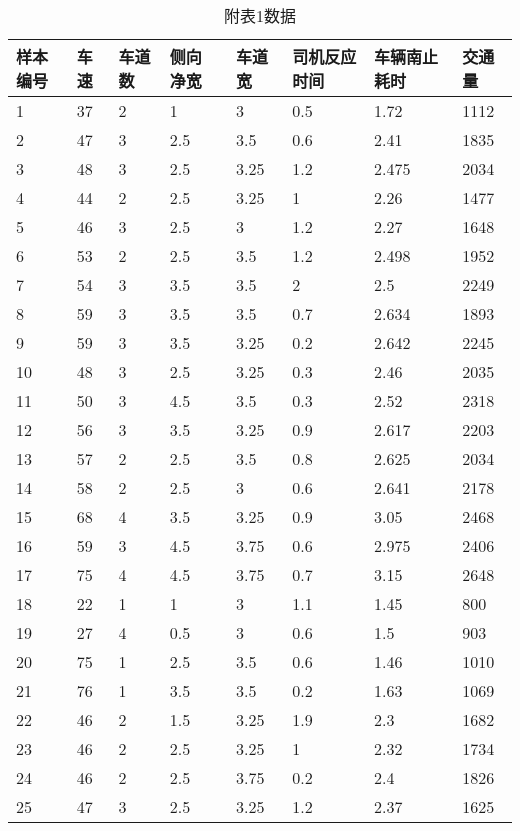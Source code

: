 
\begin{table*}[h!]
  \centering
  \small
    \caption{附表1数据}
\begin{tabular*}{\linewidth}{p{40pt}<{\centering}p{30pt}<{\centering}
p{30pt}<{\centering}p{40pt}<{\centering}p{50pt}<{\centering}p{70pt}<{\centering}
p{60pt}<{\centering}p{50pt}<{\centering}}
\toprule
样本编号 &  车速 & 车道数  & 侧向 净宽 &  车道宽  &  司机反应时间  & 车辆南止耗时  &  交通量  \\
\midrule
1 & 37 {\color{Blue} } & 2 & 1 & 3 & 0.5 & 1.72 & 1112 \\
2 & 47 & 3 & 2.5 & 3.5 & 0.6 & 2.41 & 1835 \\
3 & 48 & 3 & 2.5 & 3.25 & 1.2 & 2.475 & 2034 \\
4 & 44 & 2 & 2.5 & 3.25 & 1 & 2.26 & 1477 \\
5 & 46 & 3 & 2.5 & 3 & 1.2 & 2.27 & 1648 \\
6 & 53 & 2 & 2.5 & 3.5 & 1.2 & 2.498 & 1952 \\
7 & 54 & 3 & 3.5 & 3.5 & 2 & 2.5 & 2249 \\
8 & 59 & 3 & 3.5 & 3.5 & 0.7 & 2.634 & 1893 \\
9 & 59 & 3 & 3.5 & 3.25 & 0.2 & 2.642 & 2245 \\
10 & 48 & 3 & 2.5 & 3.25 & 0.3 & 2.46 & 2035 \\
11 & 50 & 3 & 4.5 & 3.5 & 0.3 & 2.52 & 2318 \\
12 & 56 & 3 & 3.5 & 3.25 & 0.9 & 2.617 & 2203 \\
13 & 57 & 2 & 2.5 & 3.5 & 0.8 & 2.625 & 2034 \\
14 & 58 & 2 & 2.5 & 3 & 0.6 & 2.641 & 2178 \\
15 & 68 & 4 & 3.5 & 3.25 & 0.9 & 3.05 & 2468 \\
16 & 59 & 3 & 4.5 & 3.75 & 0.6 & 2.975 & 2406 \\
17 & 75 & 4 & 4.5 & 3.75 & 0.7 & 3.15 & 2648 \\
18 & 22 & 1 & 1 & 3 & 1.1 & 1.45 & 800 \\
19 & 27 & 4 & 0.5 & 3 & 0.6 & 1.5 & 903 \\
20 & 75 & 1 & 2.5 & 3.5 & 0.6 & 1.46 & 1010 \\
21 & 76 & 1 & 3.5 & 3.5 & 0.2 & 1.63 & 1069 \\
22 & 46 & 2 & 1.5 & 3.25 & 1.9 & 2.3 & 1682 \\
23 & 46 & 2 & 2.5 & 3.25 & 1 & 2.32 & 1734 \\
24 & 46 & 2 & 2.5 & 3.75 & 0.2 & 2.4 & 1826 \\
25 & 47 & 3 & 2.5 & 3.25 & 1.2 & 2.37 & 1625 \\

\end{tabular*}
\end{table*}
